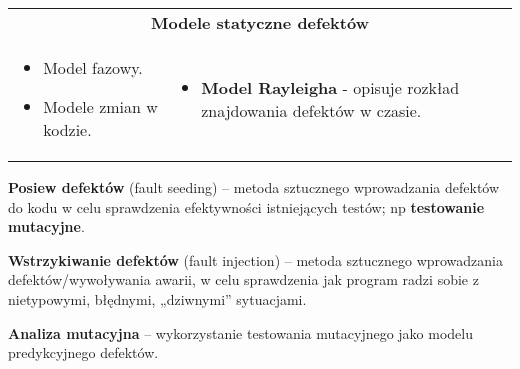 \documentclass[../main.tex]{subfiles}
\begin{document}
    \begin{table}[H]
        \begin{center}
            \begin{tabular}{p{8cm} p{8cm}}
                \multicolumn{2}{c}{\textbf{Modele statyczne defektów}} \\
                \begin{itemize}
                    \item Model fazowy.
                    \item Modele zmian w kodzie.
                \end{itemize}
                &
                \begin{itemize}
                    \item \textbf{Model Rayleigha} - opisuje rozkład znajdowania defektów w czasie.
                \end{itemize}
            \end{tabular}
        \end{center}
    \end{table}


    \textbf{Posiew defektów} (fault seeding) – metoda sztucznego wprowadzania defektów do kodu w
    celu sprawdzenia efektywności istniejących testów; np \textbf{testowanie mutacyjne}.

    \textbf{Wstrzykiwanie defektów} (fault injection) – metoda sztucznego wprowadzania defektów/wywoływania
    awarii, w celu sprawdzenia jak program radzi sobie z nietypowymi, błędnymi, „dziwnymi” sytuacjami.

    \textbf{Analiza mutacyjna} – wykorzystanie testowania mutacyjnego jako modelu predykcyjnego defektów.
\end{document}

